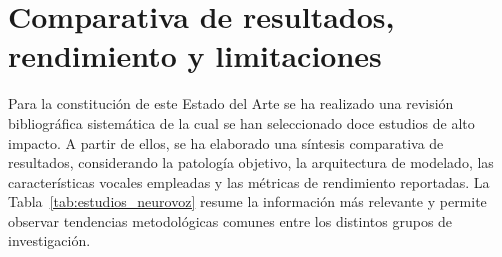 \section{Comparativa de resultados, rendimiento y limitaciones}\label{sec:comparativa}

Para la constitución de este Estado del Arte se ha realizado una revisión bibliográfica sistemática de la cual se han seleccionado doce estudios de alto impacto. A partir de ellos, se ha elaborado una síntesis comparativa de resultados, considerando la patología objetivo, la arquitectura de modelado, las características vocales empleadas y las métricas de rendimiento reportadas. La Tabla~\ref{tab:estudios_neurovoz} resume la información más relevante y permite observar tendencias metodológicas comunes entre los distintos grupos de investigación.

